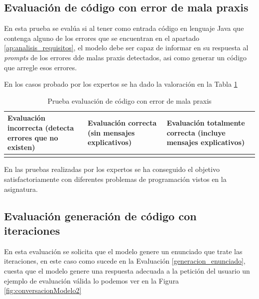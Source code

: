 \subsection{Evaluación de código con error de mala praxis}

En esta prueba se evalúa si al tener como entrada código en lenguaje Java que contenga alguno de los errores que se encuentran en el apartado \ref{ap:analisis_requisitos}, el modelo debe ser capaz de informar en su respuesta al \textit{prompts} de los errores dde malas praxis detectados, asi como generar un código que arregle esos errores.

En los casos probado por los expertos se ha dado la valoración en la Tabla \ref{tabla:evaluacion-ej3}

\begin{table}[htb]
    \centering
    \begin{tabular}{| >{\arraybackslash}m{}| >{\arraybackslash}m{} | >{\arraybackslash}m{}|} \hline
    \vspace{0.5em}  Evaluación incorrecta (detecta errores que no existen) \vspace{0.5em} &  Evaluación correcta (sin mensajes explicativos) & Evaluación totalmente correcta (incluye mensajes explicativos) \\ \hline
     &  & \multicolumn{1}{|c|}{X} \\ \hline 
    \end{tabular}\caption{Prueba evaluación de código con error de mala praxis}
    \label{tabla:evaluacion-ej3}
\end{table}

En las pruebas realizadas por los expertos se ha conseguido el objetivo satisfactoriamente con diferentes problemas de programación vistos en la asignatura.

\subsection{Evaluación generación de código con iteraciones}

En esta evaluación se solicita que el modelo genere un enunciado que trate las iteraciones, en este caso como sucede en la Evaluación \ref{generacion_enunciado}, cuesta que el modelo genere una respuesta adecuada a la petición del usuario un ejemplo de evaluación válida lo podemos ver en la Figura \ref{fig:conversacionModelo2}



